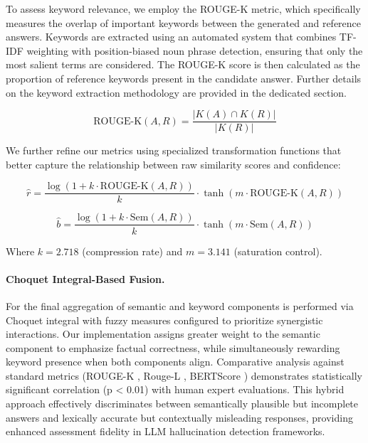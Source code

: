 \documentclass[sigconf]{acmart}
\begin{document}
To assess keyword relevance, we employ the ROUGE-K \cite{rouge_k} metric, which specifically measures the overlap of important keywords between the generated and reference answers. Keywords are extracted using an automated system that combines TF-IDF weighting with position-biased noun phrase detection, ensuring that only the most salient terms are considered. The ROUGE-K score is then calculated as the proportion of reference keywords present in the candidate answer. Further details on the keyword extraction methodology are provided in the dedicated section.

\begin{equation}
    \text{ROUGE-K}(A, R) = \frac{|K(A) \cap K(R)|}{|K(R)|}
\end{equation}

We further refine our metrics using specialized transformation functions that better capture the relationship between raw similarity scores and confidence:

\begin{equation}
\hat{r} = \frac{\log(1 + k \cdot \text{ROUGE-K}(A, R))}{k} \cdot \tanh(m \cdot \text{ROUGE-K}(A, R))
\end{equation}

\begin{equation}
\hat{b} = \frac{\log(1 + k \cdot \text{Sem}(A, R))}{k} \cdot \tanh(m \cdot \text{Sem}(A, R))
\end{equation}

Where $k=2.718$ (compression rate) and $m=3.141$ (saturation control).

\paragraph{Choquet Integral-Based Fusion.}
For the final aggregation of semantic and keyword components is performed via Choquet integral \cite{choquet1953capacities} with fuzzy measures configured to prioritize synergistic interactions. Our implementation assigns greater weight to the semantic component to emphasize factual correctness, while simultaneously rewarding keyword presence when both components align. Comparative analysis against standard metrics (ROUGE-K \cite{rouge_k}, Rouge-L \cite{rouge_l}, BERTScore \cite{bertscore}) demonstrates statistically significant correlation (p < 0.01) with human expert evaluations. This hybrid approach effectively discriminates between semantically plausible but incomplete answers and lexically accurate but contextually misleading responses, providing enhanced assessment fidelity in LLM hallucination detection frameworks.
\end{document}

